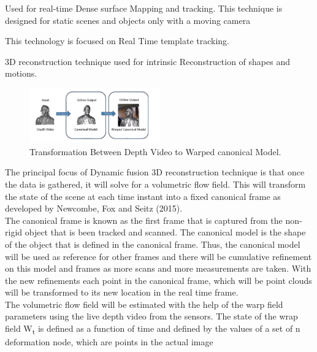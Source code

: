 \documentclass[a4paper]{article}
\begin{document}
\newpage
\begin{description}[style=nextline]
    \item[Kinect Fusion] Used for real-time Dense surface Mapping and tracking. This technique is designed for static scenes and objects only with a moving camera
    \item[DART (Dense Articulated Real Time Tracking)] This technology is focused on Real Time template tracking.
    \item[Animation Cartography] 3D reconstruction technique used for intrinsic Reconstruction of shapes and motions. 
\end{description}

\begin{figure} %
    \centering
    \includegraphics[width=0.5\textwidth]{IMG_0073.png}
    \caption{Transformation Between Depth Video to Warped canonical Model. \cite[]{newcombe_fox_seitz_2015}}
\end{figure}
The principal focus of Dynamic fusion 3D reconstruction technique is that once the data is gathered, it will solve for a volumetric flow field. 
This will transform the state of the scene at each time instant into a fixed canonical frame as developed by Newcombe, Fox and Seitz (2015). \\[10pt]
The canonical frame is known as the first frame that is captured from the non-rigid object that is been tracked and scanned. The canonical model is the shape of the object that is defined in the canonical frame. 
Thus, the canonical model will be used as reference for other frames and there will be cumulative refinement on this model and frames as more scans and more measurements are taken.
With the new refinements each point in the canonical frame, which will be point clouds will be transformed to its new location in the real time frame.\\[10pt]
The volumetric flow field will be estimated with the help of the warp field parameters using the live depth video from the sensors. 
The state of the wrap field W\textsubscript{t} is defined as a function of time and defined by the values of a set of n deformation node, which are points in the actual image
\end{document}
